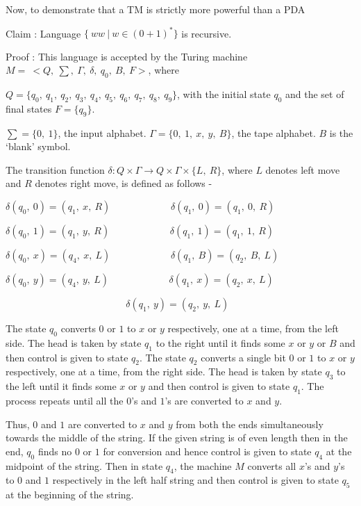 \documentclass{article}
\begin{document}
    Now, to demonstrate that a TM is strictly more powerful than a PDA
    
    Claim : Language $\{~ww ~|~ w \in (0 + 1)^*\}$ is recursive.
    
    Proof : This language is accepted by the Turing machine $M=~<Q,~\sum,~\Gamma,~\delta,~q_0,~B,~F>$, where 
    
    $Q=\{q_0,~q_1,~q_2,~q_3,~q_4,~q_5,~q_6,~q_7,~q_8,~q_9\}$, with the initial state $q_0$ and the set of final states $F=\{q_9\}$. 

    $\sum = \{0,~1\}$, the input alphabet. $\Gamma = \{0,~1,~x,~y,~B\}$, the tape alphabet. $B$ is the `blank' symbol.
    
   
    The transition function $\delta:Q \times \Gamma \rightarrow Q \times \Gamma \times \{L,~R\}$, where $L$ denotes left move and $R$ denotes right move, is defined as follows -
    
    $\delta(q_0,~0)=(q_1,~x,~R)~~~~~~~~~~~~~~~~~~~~~~~~~~~~\delta(q_1,~0)=(q_1,~0,~R)$
    
    $\delta(q_0,~1)=(q_1,~y,~R)~~~~~~~~~~~~~~~~~~~~~~~~~~~~\delta(q_1,~1)=(q_1,~1,~R)$
    
    $\delta(q_0,~x)=(q_4,~x,~L)~~~~~~~~~~~~~~~~~~~~~~~~~~~~\delta(q_1,~B)=(q_2,~B,~L)$
    
    $\delta(q_0,~y)=(q_4,~y,~L)~~~~~~~~~~~~~~~~~~~~~~~~~~~~\delta(q_1,~x)=(q_2,~x,~L)$
    
    $~~~~~~~~~~~~~~~~~~~~~~~~~~~~~~~~~~~~~~~~~~~~~~~~~~~~~~~~\delta(q_1,~y)=(q_2,~y,~L)$ 
    
    The state $q_0$ converts $0$ or $1$ to $x$ or $y$ respectively, one at a time, from the left side. The head is taken by state $q_1$ to the right until it finds some $x$ or $y$ or $B$ and then control is given to state $q_2$. The state $q_2$ converts a single bit $0$ or $1$ to $x$ or $y$ respectively, one at a time, from the right side. The head is taken by state $q_3$ to the left until it finds some $x$ or $y$ and then control is given to state $q_1$. The process repeats until all the $0$'s and $1$'s are converted to $x$ and $y$.
    
    Thus, $0$ and $1$ are converted to $x$ and $y$ from both the ends simultaneously towards the middle of the string. If the given string is of even length then in the end, $q_0$ finds no $0$ or $1$ for conversion and hence control is given to state $q_4$ at the midpoint of the string. Then in state $q_4$, the machine $M$ converts all $x$'s and $y$'s to $0$ and $1$ respectively in the left half string and then control is given to state $q_5$ at the beginning of the string.
    
\end{document}
